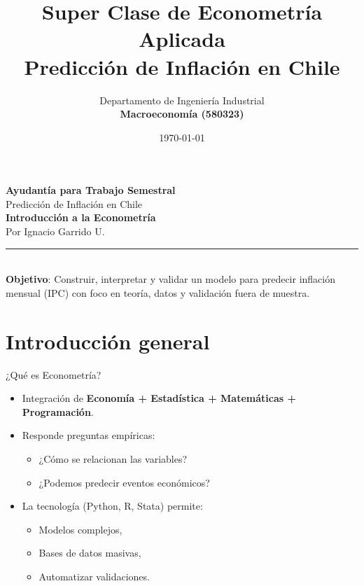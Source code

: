 \documentclass[aspectratio=169,10pt]{beamer}
\title[Super Clase Econometría]{Super Clase de Econometría Aplicada\\ Predicción de Inflación en Chile}
\author[]{Departamento de Ingeniería Industrial\\ \textbf{Macroeconomía (580323)}}
\institute[]{Universidad de Concepción}
\date{\today}
\begin{document}
\begin{frame}[plain]

  \begin{center}
    {\Large \bfseries Ayudantía para Trabajo Semestral}\\[0.3em]
    {\large Predicción de Inflación en Chile}\\[1.2em]

    {\Large \color{UdeCBlue}\textbf{Introducción a la Econometría}}\\[0.4em]
    {\small Por Ignacio Garrido U.}\\[2em]
  \end{center}

  \vfill
  \begin{center}
    \color{UdeCBlue}\rule{0.65\linewidth}{1pt}\\[0.4em]
    \small 
    \textbf{Objetivo}: Construir, interpretar y validar un modelo para predecir inflación mensual (IPC) 
    con foco en \alert{teoría}, \alert{datos} y \alert{validación fuera de muestra}.
  \end{center}

\end{frame}




\section{Introducción general}

\begin{frame}{¿Qué es Econometría?}
  \begin{itemize}
    \item Integración de \textbf{Economía + Estadística + Matemáticas + Programación}.
    \item Responde preguntas empíricas:
      \begin{itemize}
        \item ¿Cómo se relacionan las variables?
        \item ¿Podemos predecir eventos económicos?
      \end{itemize}
    \item La tecnología (Python, R, Stata) permite:
      \begin{itemize}
        \item Modelos complejos,
        \item Bases de datos masivas,
        \item Automatizar validaciones.
      \end{itemize}
  \end{itemize}
\end{frame}
\end{document}

